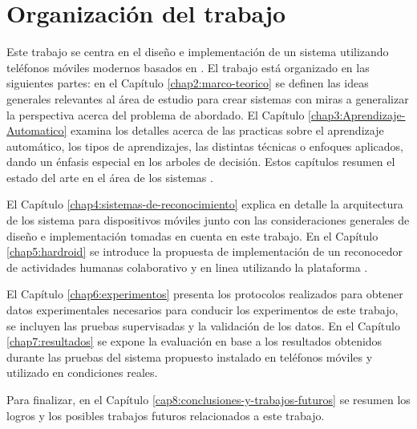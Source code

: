 \section{Organización del trabajo}

\label{sec14:organizaciuxf3n-del-trabajo}

Este trabajo se centra en el diseño e implementación de un sistema
 utilizando teléfonos móviles modernos basados en .
El trabajo está organizado en las siguientes partes: en el Capítulo
\ref{chap2:marco-teorico} se definen las ideas generales relevantes
al área de estudio para crear sistemas  con miras a generalizar
la perspectiva acerca del problema de abordado. El Capítulo \ref{chap3:Aprendizaje-Automatico}
examina los detalles acerca de las practicas sobre el aprendizaje
automático, los tipos de aprendizajes, las distintas técnicas o enfoques
aplicados, dando un énfasis especial en los arboles de decisión. Estos
capítulos resumen el estado del arte en el área de los sistemas .

El Capítulo \ref{chap4:sistemas-de-reconocimiento} explica en detalle
la arquitectura de los sistema  para dispositivos móviles
junto con las consideraciones generales de diseño e implementación
tomadas en cuenta en este trabajo. En el Capítulo \ref{chap5:hardroid}
se introduce la propuesta de implementación de un reconocedor de actividades
humanas colaborativo y en linea utilizando la plataforma .

El Capítulo \ref{chap6:experimentos} presenta los protocolos realizados
para obtener datos experimentales necesarios para conducir los experimentos
de este trabajo, se incluyen las pruebas supervisadas y la validación
de los datos. En el Capítulo \ref{chap7:resultados} se expone la
evaluación en base a los resultados obtenidos durante las pruebas
del sistema  propuesto instalado en teléfonos móviles y
utilizado en condiciones reales. 

Para finalizar, en el Capítulo \ref{cap8:conclusiones-y-trabajos-futuros}
se resumen los logros y los posibles trabajos futuros relacionados
a este trabajo. 
